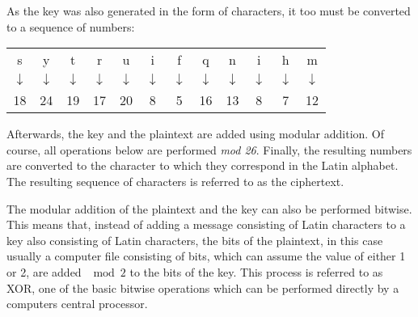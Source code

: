 \documentclass[12pt, a4paper]{report}
\theoremstyle{definition}
\theoremstyle{remark}
\begin{document}
As the key was also generated in the form of characters, it too must be converted to a sequence of numbers:

\begin{center}
\begin{tabular}{cccccccccccc}
s & y & t & r & u & i & f & q & n & i & h & m \\
$\downarrow$ & $\downarrow$ & $\downarrow$ & $\downarrow$ & $\downarrow$ & $\downarrow$ & $\downarrow$ & $\downarrow$ & $\downarrow$ & $\downarrow$ & $\downarrow$ & $\downarrow$  \\
18 & 24 & 19 & 17 & 20 & 8 & 5 & 16 & 13 & 8 & 7 & 12 \\
\end{tabular}
\end{center}

Afterwards, the key and the plaintext are added using modular addition. Of course, all operations below are performed  \textit{mod 26}. Finally, the resulting numbers are converted to the character to which they correspond in the Latin alphabet. The resulting sequence of characters is referred to as the ciphertext.

\begin{center}
\end{center}

The modular addition of the plaintext and the key can also be performed bitwise. This means that, instead of adding a message consisting of Latin characters to a key also consisting of Latin characters, the bits of the plaintext, in this case usually a computer file consisting of bits, which can assume the value of either 1 or 2, are added $\mod 2$ to the bits of the key. This process is referred to as XOR, one of the basic bitwise operations which can be performed directly by a computers central processor.
\end{document}
